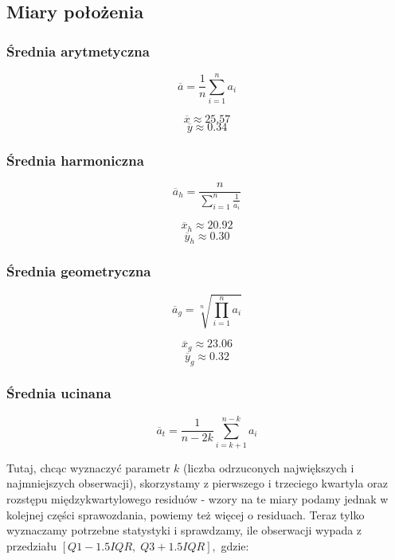\documentclass[fleqn]{article}
\begin{document}

    \subsection{Miary położenia}


    \subsubsection{Średnia arytmetyczna}

    $$\overline{a} = \frac{1}{n} \sum_{i=1}^{n} a_{i}$$


    $$\overline{x} \approx 25.57$$
    $$\overline{y} \approx 0.34$$

    \subsubsection{Średnia harmoniczna}

    $$\overline{a}_{h} = \frac{n}{\sum_{i=1}^{n} \frac{1}{a_{i}}}$$ 
    

    $$\overline{x}_{h} \approx 20.92$$ 
    $$\overline{y}_{h} \approx 0.30$$ 

    \subsubsection{Średnia geometryczna}

    $$\overline{a}_{g} = \sqrt[n]{\prod_{i=1}^{n}a_{i}}$$


    $$\overline{x}_{g} \approx 23.06$$ 
    $$\overline{y}_{g} \approx 0.32$$ 

    \subsubsection{Średnia ucinana}

    $$\overline{a}_{t} = \frac{1}{n-2k} \sum_{i=k+1}^{n-k} a_{i}$$


    \noindent Tutaj, chcąc wyznaczyć parametr $k$ (liczba odrzuconych największych i najmniejszych obserwacji),
    skorzystamy z pierwszego i trzeciego kwartyla oraz rozstępu międzykwartylowego residuów  - 
    wzory na te miary podamy jednak w kolejnej części sprawozdania, powiemy też więcej o residuach. Teraz tylko wyznaczamy potrzebne statystyki
    i sprawdzamy, ile obserwacji wypada z przedziału $\left[Q1-1.5IQR,\; Q3+1.5IQR\right],$ gdzie:
    
\end{document}
